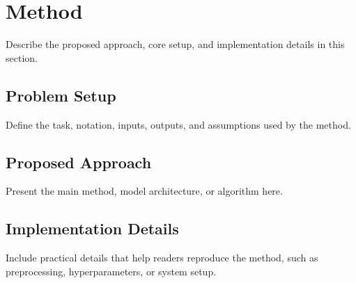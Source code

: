 \section{Method}

Describe the proposed approach, core setup, and implementation details in this section.

\subsection{Problem Setup}

Define the task, notation, inputs, outputs, and assumptions used by the method.

\subsection{Proposed Approach}

Present the main method, model architecture, or algorithm here.

\subsection{Implementation Details}

Include practical details that help readers reproduce the method, such as preprocessing, hyperparameters, or system setup.
